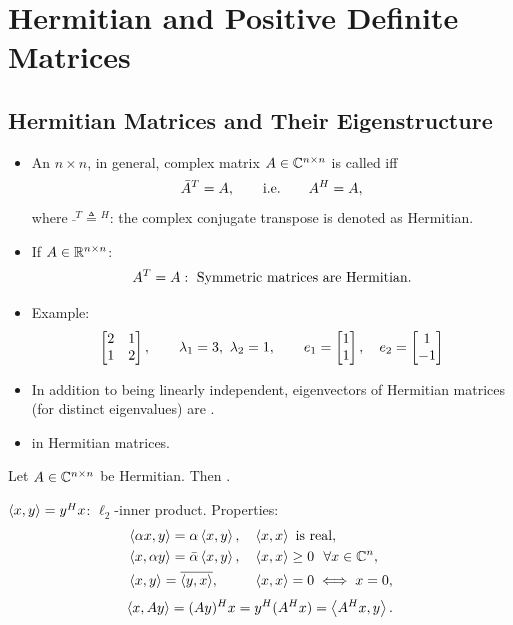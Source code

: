 \section{Hermitian and Positive Definite Matrices}\label{sec:hermitian}

\subsection{Hermitian Matrices and Their Eigenstructure}\label{ss:hermitian-props}

\begin{itemize}
\item\leavevmode{}An $n\times n$, in general, complex matrix $A\in\mathbb{C}^{n\times n}$ is called  iff
\[
\bar A^{T}=A, \qquad\text{i.e.}\qquad A^{H}=A,
\]
where $\bar{\ }^{T}\triangleq{}^{H}$: the complex conjugate transpose is denoted as Hermitian.
\item If $A\in\mathbb{R}^{n\times n}$:
\[
A^{T}=A:\ \text{Symmetric matrices are Hermitian.}
\]
\item Example:
\[
\bmat{2&1\\1&2},\qquad \lambda_1=3,\ \lambda_2=1,\qquad e_1=\bmat{1\\1},\quad e_2=\bmat{1\\-1}
\]
\item In addition to being linearly independent, eigenvectors of Hermitian matrices (for distinct eigenvalues) are .
\item {} in Hermitian matrices.
\end{itemize}

\begin{theorem}
Let $A\in\mathbb{C}^{n\times n}$ be Hermitian. Then .
\end{theorem}

\point $\left\langle x, y \right\rangle=y^{H} x$: $\ell_2$-inner product. Properties:
\begin{align*}
&\left\langle \alpha x, y \right\rangle=\alpha\left\langle x, y \right\rangle, & &\left\langle x, x \right\rangle\text{ is real},\\
&\left\langle x, \alpha y \right\rangle=\bar\alpha\left\langle x, y \right\rangle, & &\left\langle x, x \right\rangle\geq0\ \ \forall x\in\mathbb{C}^n,\\
&\left\langle x, y \right\rangle=\overline{\left\langle y, x \right\rangle}, & &\left\langle x, x \right\rangle=0\iff x=0,
\end{align*}
\[
\left\langle x, Ay \right\rangle=(Ay)^{H} x=y^{H}(A^{H} x)=\left\langle A^{H} x, y \right\rangle.
\]

